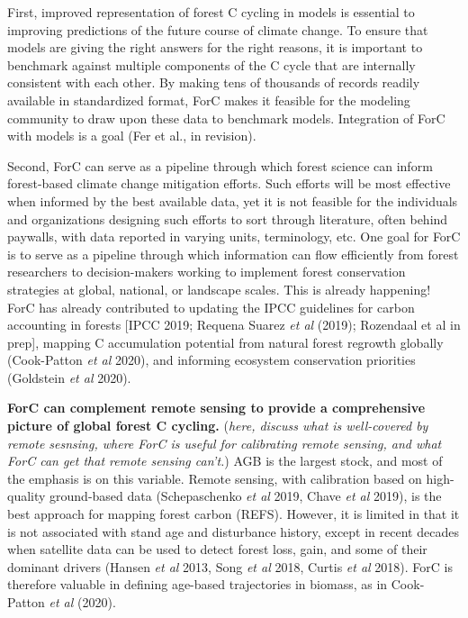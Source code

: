\documentclass[
]{article}
\begin{document}
First, improved representation of forest C cycling in models is
essential to improving predictions of the future course of climate
change. To ensure that models are giving the right answers for the right
reasons, it is important to benchmark against multiple components of the
C cycle that are internally consistent with each other. By making tens
of thousands of records readily available in standardized format, ForC
makes it feasible for the modeling community to draw upon these data to
benchmark models. Integration of ForC with models is a goal (Fer et al.,
in revision).

Second, ForC can serve as a pipeline through which forest science can
inform forest-based climate change mitigation efforts. Such efforts will
be most effective when informed by the best available data, yet it is
not feasible for the individuals and organizations designing such
efforts to sort through literature, often behind paywalls, with data
reported in varying units, terminology, etc. One goal for ForC is to
serve as a pipeline through which information can flow efficiently from
forest researchers to decision-makers working to implement forest
conservation strategies at global, national, or landscape scales. This
is already happening! ForC has already contributed to updating the IPCC
guidelines for carbon accounting in forests {[}IPCC 2019; Requena Suarez
\emph{et al} (2019); Rozendaal et al in prep{]}, mapping C accumulation
potential from natural forest regrowth globally (Cook-Patton \emph{et
al} 2020), and informing ecosystem conservation priorities (Goldstein
\emph{et al} 2020).

\textbf{ForC can complement remote sensing to provide a comprehensive
picture of global forest C cycling.} (\emph{here, discuss what is
well-covered by remote sesnsing, where ForC is useful for calibrating
remote sensing, and what ForC can get that remote sensing can't.}) AGB
is the largest stock, and most of the emphasis is on this variable.
Remote sensing, with calibration based on high-quality ground-based data
(Schepaschenko \emph{et al} 2019, Chave \emph{et al} 2019), is the best
approach for mapping forest carbon (REFS). However, it is limited in
that it is not associated with stand age and disturbance history, except
in recent decades when satellite data can be used to detect forest loss,
gain, and some of their dominant drivers (Hansen \emph{et al} 2013, Song
\emph{et al} 2018, Curtis \emph{et al} 2018). ForC is therefore valuable
in defining age-based trajectories in biomass, as in Cook-Patton
\emph{et al} (2020).
\end{document}
